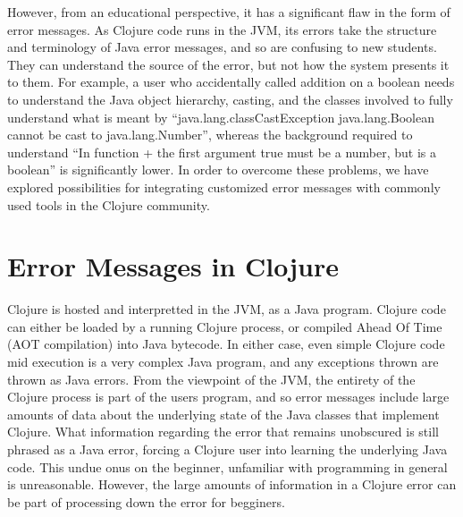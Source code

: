 \documentclass[12pt]{article}
\newcommand{\comment}[1]{{\bf \tt  {#1}}}
\newcommand{\emcomment}[1]{\textcolor{ForestGreen}{\comment{Elena: {#1}}}}
\begin{document}
However, from an educational perspective, it has a significant flaw in the form of error messages.
As Clojure code runs in the JVM, its errors take the structure and terminology of Java error messages,
and so are confusing to new students. They can understand the source of the error,
but not how the system presents it to them.
For example, a user who accidentally called addition on a boolean needs
 to understand the Java object hierarchy, casting,
 and the classes involved to fully understand what is meant by
 ``java.lang.classCastException java.lang.Boolean cannot be cast to java.lang.Number'',
whereas the background required to understand ``In function + the first argument true must be a number, but is a boolean''
 is significantly lower.
 In order to overcome these problems,
 we have explored possibilities for integrating customized error messages with commonly used tools in the Clojure community.




\section{Error Messages in Clojure}
Clojure is hosted and interpretted in the JVM, as a Java program.
Clojure code can either be loaded by a running Clojure process, or
compiled Ahead Of Time (AOT compilation) into Java bytecode. In either case,
even simple Clojure code mid execution is a very complex Java program,
and any exceptions thrown are thrown as Java errors.
From the viewpoint of the JVM, the entirety of the Clojure process is
part of the users program, and so error messages include large amounts
of data about the underlying state of the Java classes that implement Clojure.
What information regarding the error that remains unobscured is still
phrased as a Java error, forcing a Clojure user into learning
the underlying Java code. This undue onus on the beginner,
unfamiliar with programming in general is unreasonable.
However, the large amounts of information in a Clojure error
can be part of processing down the error for begginers.
\end{document}
